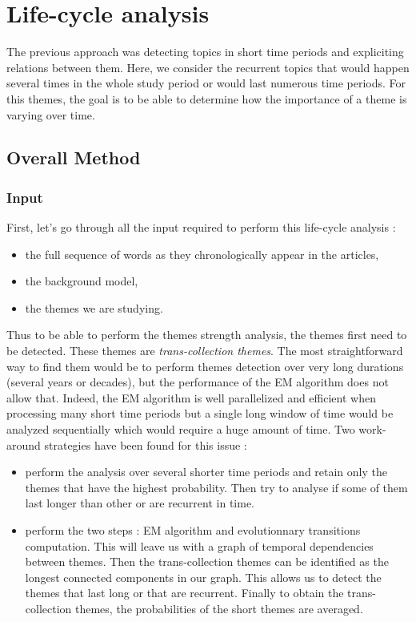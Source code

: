 \section{Life-cycle analysis}
The previous approach was detecting topics in short time periods and expliciting relations between them. Here, we consider the recurrent topics that would happen several times in the whole study period or would last numerous time periods. For this themes, the goal is to be able to determine how the importance of a theme is varying over time.

\subsection{Overall Method}

\subsubsection*{Input}
First, let's go through all the input required to perform this life-cycle analysis :
\begin{itemize}
\item the full sequence of words as they chronologically appear in the articles,
\item the background model,
\item the themes we are studying.

\end{itemize}

Thus to be able to perform the themes strength analysis, the themes first need to be detected. These themes are \emph{trans-collection themes}. The most straightforward way to find them would be to perform themes detection over very long durations (several years or decades), but the performance of the EM algorithm does not allow that. Indeed, the EM algorithm is well parallelized and efficient when processing many short time periods but a single long window of time would be analyzed sequentially which would require a huge amount of time. Two work-around strategies have been found for this issue :
\begin{itemize}
\item perform the analysis over several shorter time periods and retain only the themes that have the highest probability. Then try to analyse if some of them last longer than other or are recurrent in time.
\item perform the two steps  : EM algorithm and evolutionnary transitions computation. This will leave us with a graph of temporal dependencies between themes. Then the trans-collection themes can be identified as the longest connected components in our graph. This allows us to detect the themes that last long or that are recurrent. Finally to obtain the trans-collection themes, the probabilities of the short themes are averaged.
\end{itemize}

